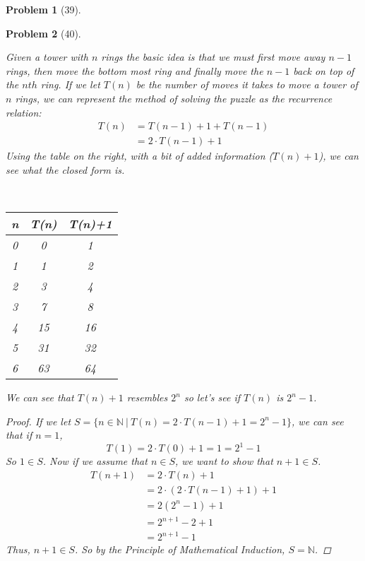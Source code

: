 \documentclass{article}
\theoremstyle{problem}
\newtheorem{prob}{Problem}
\theoremstyle{plain}
\theoremstyle{remark}
\begin{document}
\begin{prob}[39]
\begin{enumerate}[a)]
  \end{enumerate}
\end{prob}

\begin{prob}[40]
  \begin{multicols}{2}
    Given a tower with $n$ rings the basic idea is that we must first move away $n-1$ rings, then move the bottom most ring and finally move the $n-1$ back on top of the $nth$ ring. If we let $T(n)$ be the number of moves it takes to move a tower of $n$ rings, we can represent the method of solving the puzzle as the recurrence relation:
\begin{align*}
T(n) &= T(n-1) + 1 + T(n - 1)\\
     &= 2\cdot T(n - 1) + 1
\end{align*}
Using the table on the right, with a bit of added information ($T(n)+1$), we can see what the closed form is.
    \vfill
    \columnbreak
    \begin{center}\ \\[1cm]
      \begin{tabular}{c|c c}
        n & T(n) & T(n)+1\\
        \hline
        0 & 0 & 1\\
        1 & 1 & 2\\
        2 & 3 & 4\\
        3 & 7 & 8\\
        4 & 15& 16\\
        5 & 31& 32\\
        6 & 63& 64
      \end{tabular}
  \end{center}
\end{multicols}
  We can see that $T(n) + 1$ resembles $2^n$ so let's see if $T(n)$ is $2^n - 1$. 
\begin{proof}
If we let $S = \{n \in \mathbb{N}\ |\ T(n) = 2\cdot T(n-1) + 1 = 2^n -1\}$, we can see that if $n = 1$,
$$
  T(1) = 2\cdot T(0) +1 = 1 = 2^1 - 1
$$
So $1 \in S$. Now if we assume that $n \in S$, we want to show that $n + 1 \in S$.
\begin{align*}
  T(n+1) &= 2\cdot T(n) + 1\\
         &= 2\cdot (2\cdot T(n-1) + 1) + 1\\
         &= 2 (2^n - 1) + 1\\
         &= 2^{n+1} - 2 + 1\\
         &= 2^{n+1} - 1
\end{align*}
Thus, $n + 1 \in S$. So by the Principle of Mathematical Induction, $S = \mathbb{N}$.
\end{proof}
\end{prob}
\end{document}
